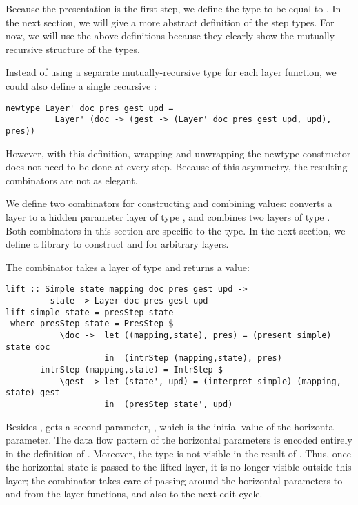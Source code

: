 Because the presentation is the first step, we define the  type to be equal to . In the next section, we will give a more abstract definition of the step types. For now, we will use the above definitions because they clearly show the mutually recursive structure of the types. %

Instead of using a separate mutually-recursive type for each layer function, we could also define a single recursive :

\begin{small}
\begin{verbatim}
newtype Layer' doc pres gest upd = 
          Layer' (doc -> (gest -> (Layer' doc pres gest upd, upd),  pres))
\end{verbatim}
\end{small}

However, with this definition, wrapping and unwrapping the newtype constructor does not need to be done at every step. Because of this asymmetry, the resulting combinators are not as elegant.

We define two combinators for constructing and combining  values:  converts  a  layer to a hidden parameter layer of type , and  combines two layers of type . Both combinators in this section are specific to the  type. In the next section, we define a library to construct  and  for arbitrary layers.



The combinator  takes a layer of type  and returns a  value:

\begin{small}
\begin{verbatim}
lift :: Simple state mapping doc pres gest upd ->
         state -> Layer doc pres gest upd
lift simple state = presStep state 
 where presStep state = PresStep $
           \doc ->  let ((mapping,state), pres) = (present simple) state doc                                         
                    in  (intrStep (mapping,state), pres)
       intrStep (mapping,state) = IntrStep $
           \gest -> let (state', upd) = (interpret simple) (mapping, state) gest                     
                    in  (presStep state', upd)
\end{verbatim}
\end{small}

Besides ,  gets a second parameter, , which is the initial value of the horizontal parameter. The data flow pattern of the horizontal parameters is encoded entirely in the definition of . Moreover, the  type is not visible in the result of . Thus, once the horizontal state is passed to the lifted layer, it is no longer visible outside this layer; the  combinator takes care of passing around the horizontal parameters to and from the layer functions, and also to the next edit cycle. 


